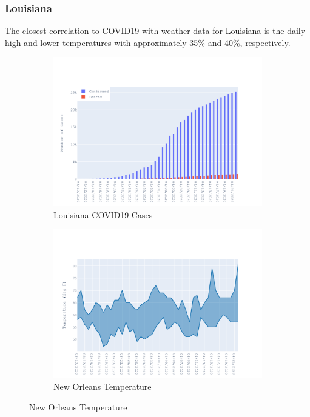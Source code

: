 \documentclass{homework}
\begin{document}
\newpage
\subsubsection{Louisiana}

The closest correlation to COVID19 with weather data for Louisiana is the daily high and lower temperatures with approximately 35\% and 40\%, respectively.

\begin{figure}[H]
  \centering
  \begin{subfigure}{0.45\linewidth}
    \includegraphics[width=\linewidth]{task4/Louisiana_cases.png}
    \caption{Louisiana COVID19 Cases}
  \end{subfigure}
  \hfil
  \begin{subfigure}{0.45\linewidth}
    \includegraphics[width=\linewidth]{task4/Louisiana_temp.png}
    \caption{New Orleans Temperature}
  \end{subfigure}


\end{figure}
\end{document}
